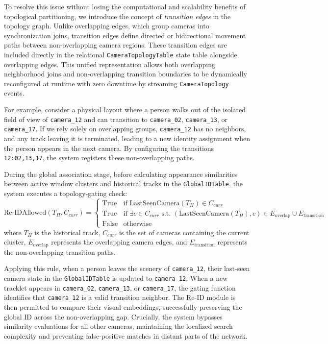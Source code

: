 \documentclass[11pt]{article}
\begin{document}
To resolve this issue without losing the computational and scalability benefits of topological partitioning, we introduce the concept of \emph{transition edges} in the topology graph. Unlike overlapping edges, which group cameras into synchronization joins, transition edges define directed or bidirectional movement paths between non-overlapping camera regions. These transition edges are included directly in the relational \texttt{CameraTopologyTable} state table alongside overlapping edges. This unified representation allows both overlapping neighborhood joins and non-overlapping transition boundaries to be dynamically reconfigured at runtime with zero downtime by streaming \texttt{CameraTopology} events.

For example, consider a physical layout where a person walks out of the isolated field of view of \texttt{camera\_12} and can transition to \texttt{camera\_02}, \texttt{camera\_13}, or \texttt{camera\_17}. If we rely solely on overlapping groups, \texttt{camera\_12} has no neighbors, and any track leaving it is terminated, leading to a new identity assignment when the person appears in the next camera. By configuring the transitions \texttt{12:02,13,17}, the system registers these non-overlapping paths.

During the global association stage, before calculating appearance similarities between active window clusters and historical tracks in the \texttt{GlobalIDTable}, the system executes a topology-gating check:
\begin{equation}
    \text{Re-IDAllowed}(T_H, C_{curr}) = \begin{cases}
        \text{True} & \text{if } \text{LastSeenCamera}(T_H) \in C_{curr} \\
        \text{True} & \text{if } \exists c \in C_{curr} \text{ s.t. } (\text{LastSeenCamera}(T_H), c) \in E_{\text{overlap}} \cup E_{\text{transition}} \\
        \text{False} & \text{otherwise}
    \end{cases}
\end{equation}
where $T_H$ is the historical track, $C_{curr}$ is the set of cameras containing the current cluster, $E_{\text{overlap}}$ represents the overlapping camera edges, and $E_{\text{transition}}$ represents the non-overlapping transition paths.

Applying this rule, when a person leaves the scenery of \texttt{camera\_12}, their last-seen camera state in the \texttt{GlobalIDTable} is updated to \texttt{camera\_12}. When a new tracklet appears in \texttt{camera\_02}, \texttt{camera\_13}, or \texttt{camera\_17}, the gating function identifies that \texttt{camera\_12} is a valid transition neighbor. The Re-ID module is then permitted to compare their visual embeddings, successfully preserving the global ID across the non-overlapping gap. Crucially, the system bypasses similarity evaluations for all other cameras, maintaining the localized search complexity and preventing false-positive matches in distant parts of the network.
\end{document}
